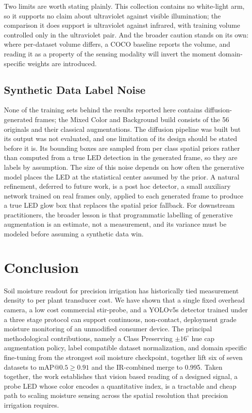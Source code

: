 ﻿\documentclass[journal]{IEEEtran}
\begin{document}
Two limits are worth stating plainly. This collection contains no white-light arm, so it supports no claim about ultraviolet against visible illumination; the comparison it does support is ultraviolet against infrared, with training volume controlled only in the ultraviolet pair. And the broader caution stands on its own: where per-dataset volume differs, a COCO baseline reports the volume, and reading it as a property of the sensing modality will invert the moment domain-specific weights are introduced.

\subsection{Synthetic Data Label Noise}
None of the training sets behind the results reported here contains diffusion-generated frames; the Mixed Color and Background build consists of the 56 originals and their classical augmentations. The diffusion pipeline was built but its output was not evaluated, and one limitation of its design should be stated before it is. Its bounding boxes are sampled from per class spatial priors rather than computed from a true LED detection in the generated frame, so they are labels by assumption. The size of this noise depends on how often the generative model places the LED at the statistical center assumed by the prior. A natural refinement, deferred to future work, is a post hoc detector, a small auxiliary network trained on real frames only, applied to each generated frame to produce a true LED glow box that replaces the spatial prior fallback. For downstream practitioners, the broader lesson is that programmatic labelling of generative augmentation is an estimate, not a measurement, and its variance must be modeled before assuming a synthetic data win.

\section{Conclusion}
\label{sec:conclusion}
Soil moisture readout for precision irrigation has historically tied measurement density to per plant transducer cost. We have shown that a single fixed overhead camera, a low cost commercial stir-probe, and a YOLOv5s detector trained under a three stage protocol can support continuous, non-contact, deployment grade moisture monitoring of an unmodified consumer device. The principal methodological contributions, namely a Class Preserving $\pm 16^{\circ}$ hue cap augmentation policy, label compatible dataset normalization, and domain specific fine-tuning from the strongest soil moisture checkpoint, together lift six of seven datasets to $\text{mAP@0.5} \geq 0.91$ and the IR-combined merge to 0.995. Taken together, the work establishes that vision based reading of a designed signal, a probe LED whose color encodes a quantitative index, is a tractable and cheap path to scaling moisture sensing across the spatial resolution that precision irrigation requires.



\end{document}
